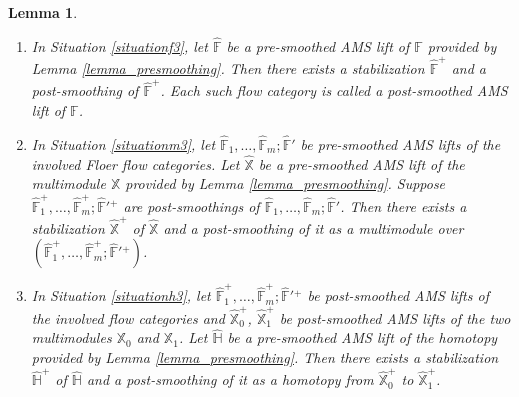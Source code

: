 \documentclass[reqno, 10pt]{amsart}
\numberwithin{equation}{section}
\numberwithin{equation}{section}
\newtheorem{lemma}[thm]{Lemma}
\theoremstyle{definition}
\theoremstyle{remark}
\newcommand{\mb}{\mathbb}
\begin{document}
\begin{lemma}\label{lemma_postsmoothing}\hfill 
\begin{enumerate}

\item In Situation \ref{situationf3}, let $\hat {\mb F}$ be a pre-smoothed AMS lift of ${\mb F}$ provided by Lemma \ref{lemma_presmoothing}. Then there exists a stabilization $\hat {\mb F}^+$ and a post-smoothing of $\hat {\mb F}^+$. Each such flow category is called a post-smoothed AMS lift of ${\mb F}$.

\item In Situation \ref{situationm3}, let $\hat {\mb F}_1, \ldots, \hat {\mb F}_m; \hat {\mb F}'$ be pre-smoothed AMS lifts of the involved Floer flow categories. Let $\hat {\mb X}$ be a pre-smoothed AMS lift of the multimodule ${\mb X}$ provided by Lemma \ref{lemma_presmoothing}. Suppose $\hat {\mb F}_1^+, \ldots, \hat {\mb F}_m^+; \hat {\mb F}'{}^+$ are post-smoothings of $\hat {\mb F}_1, \ldots, \hat {\mb F}_m; \hat {\mb F}'$. Then there exists a stabilization $\hat {\mb X}^+$ of $\hat {\mb X}$ and a post-smoothing of it as a multimodule over $(\hat {\mb F}_1^+, \ldots, \hat {\mb F}_m^+; \hat {\mb F}'{}^+)$.

\item In Situation \ref{situationh3}, let $\hat {\mb F}_1^+, \ldots, \hat {\mb F}_m^+; \hat{\mb F}'{}^+$ be post-smoothed AMS lifts of the involved flow categories and $\hat {\mb X}_0^+$, $\hat {\mb X}_1^+$ be post-smoothed AMS lifts of the two multimodules ${\mb X}_0$ and ${\mb X}_1$. Let $\hat {\mb H}$ be a pre-smoothed AMS lift of the homotopy provided by Lemma \ref{lemma_presmoothing}. Then there exists a stabilization $\hat {\mb H}^+$ of $\hat {\mb H}$ and a post-smoothing of it as a homotopy from $\hat {\mb X}_0^+$ to $\hat {\mb X}_1^+$.
\end{enumerate}
\end{lemma}
\end{document}
